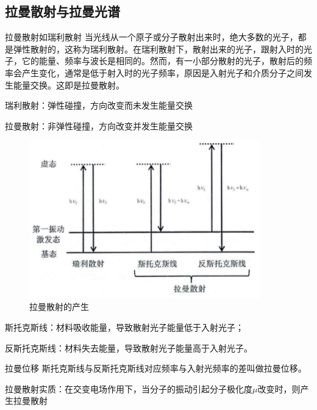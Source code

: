 \subsection{拉曼散射与拉曼光谱}
\begin{definition*}{拉曼散射如瑞利散射}
    当光线从一个原子或分子散射出来时，绝大多数的光子，都是弹性散射的，这称为瑞利散射。在瑞利散射下，散射出来的光子，跟射入时的光子，它的能量、频率与波长是相同的。然而，有一小部分散射的光子，散射后的频率会产生变化，通常是低于射入时的光子频率，原因是入射光子和介质分子之间发生能量交换。这即是拉曼散射。
\end{definition*}
\begin{note}
    瑞利散射：弹性碰撞，方向改变而未发生能量交换

    拉曼散射：非弹性碰撞，方向改变并发生能量交换
\end{note}
\begin{figure}[ht]
    \centering
    \includegraphics[width=10cm]{image/chp5_sers.png}
    \caption{拉曼散射的产生}
    \label{fig:chp5_laman}
\end{figure}
斯托克斯线：材料吸收能量，导致散射光子能量低于入射光子；

反斯托克斯线：材料失去能量，导致散射光子能量高于入射光子。
\begin{definition*}{拉曼位移}
    斯托克斯线与反斯托克斯线对应频率与入射光频率的差叫做拉曼位移。
\end{definition*}

拉曼散射实质：在交变电场作用下，当分子的振动引起分子极化度$\mu$改变时，则产生拉曼散射

